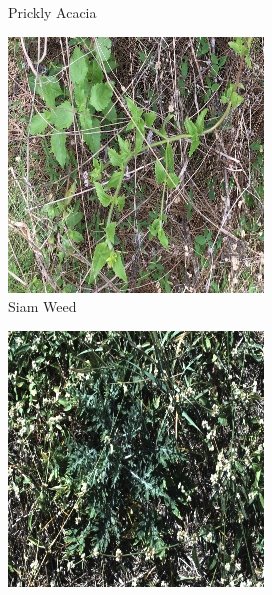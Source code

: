 \begin{figure}[!h]
\begin{subfigure}{0.24\textwidth}
        \caption{Prickly Acacia}
    \end{subfigure}
    \hfill
    \begin{subfigure}{0.24\textwidth}
        \includegraphics[width=\textwidth]{figuras/problema/siam_weed.jpg}
        \caption{Siam Weed}
    \end{subfigure}
    \hfill
    \begin{subfigure}{0.24\textwidth}
        \includegraphics[width=\textwidth]{figuras/problema/parthenium.jpg}

\end{subfigure}
\end{figure}
